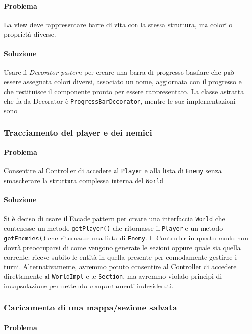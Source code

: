 \documentclass[a4paper,12pt]{report}
\begin{document}
\paragraph{Problema} La view deve rappresentare barre di vita con la stessa struttura, ma colori o proprietà diverse.
\paragraph{Soluzione} Usare il \textit{Decorator pattern} per creare una barra di progresso basilare che può essere assegnata colori diversi, associato un nome, aggiornata con il progresso e che restituisce il componente pronto per essere rappresentato. La classe astratta che fa da Decorator è \texttt{ProgressBarDecorator}, mentre le sue implementazioni sono 

\subsubsection*{Tracciamento del player e dei nemici}
\paragraph{Problema} Consentire al Controller di accedere al \texttt{Player} e alla lista di \texttt{Enemy} senza smascherare la struttura complessa interna del \texttt{World}
\paragraph{Soluzione} Si è deciso di usare il Facade pattern per creare una interfaccia \texttt{World} che contenesse un metodo \texttt{getPlayer()} che ritornasse il \texttt{Player} e un metodo \texttt{getEnemies()} che ritornasse una lista di \texttt{Enemy}. Il Controller in questo modo non dovrà preoccuparsi di come vengono generate le sezioni oppure quale sia quella corrente: riceve subito le entità in quella presente per comodamente gestirne i turni. Alternativamente, avremmo potuto consentire al Controller di accedere direttamente al \texttt{WorldImpl} e le \texttt{Section}, ma avremmo violato principi di incapsulazione permettendo comportamenti indesiderati.

\subsubsection*{Caricamento di una mappa/sezione salvata}
\paragraph{Problema} 
\end{document}
